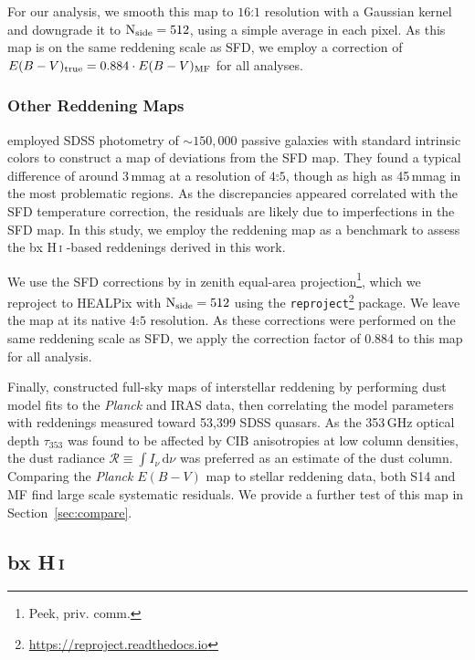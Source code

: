 \documentclass[iop,apj]{emulateapj}
\makeatletter
\def\testbx{bx}%
\DeclareRobustCommand{\ion}[2]{%
\relax\ifmmode
\ifx\testbx\f@series
{\mathbf{#1\,\mathsc{#2}}}\else
{\mathrm{#1\,\mathsc{#2}}}\fi
\else\textup{#1\,{\mdseries\textsc{#2}}}%
\fi}
\makeatother
\begin{document}
For our analysis, we smooth this map to $16\overset{'}{.}1$ resolution with a Gaussian kernel and downgrade it to $\rm N_{side}=512$, using a simple average in each pixel. As this map is on the same reddening scale as SFD, we employ a correction of $E(B-V)_{\rm true} = 0.884\cdot E(B-V)_{\rm MF}$ for all analyses.

\subsubsection{Other Reddening Maps}
\citet{Peek+Graves_2010} employed SDSS photometry of $\sim 150,000$ passive galaxies with standard intrinsic colors to construct a map of deviations from the SFD map. They found a typical difference of around 3\,mmag at a resolution of $4\overset{\circ}{.}5$, though as high as 45\,mmag in the most problematic regions. As the discrepancies appeared correlated with the SFD temperature correction, the residuals are likely due to imperfections in the SFD map. In this study, we employ the \citet{Peek+Graves_2010} reddening map as a benchmark to assess the \ion{H}{i}-based reddenings derived in this work. 

We use the SFD corrections by \citet{Peek+Graves_2010} in zenith equal-area projection\footnote{Peek, priv. comm.}, which we reproject to HEALPix with $\rm N_{side}=512$ using the \texttt{reproject}\footnote{\url{https://reproject.readthedocs.io}} package. We leave the map at its native $4\overset{\circ}{.}5$ resolution. As these corrections were performed on the same reddening scale as SFD, we apply the correction factor of 0.884 to this map for all analysis.

Finally, \citet{Planck_2013_XI} constructed full-sky maps of interstellar reddening by performing dust model fits to the {\it Planck} and IRAS data, then correlating the model parameters with reddenings measured toward 53,399 SDSS quasars. As the 353\,GHz optical depth $\tau_{353}$ was found to be affected by CIB anisotropies at low column densities, the dust radiance $\mathcal{R} \equiv \int I_{\nu}\,\mathrm{d}\nu$ was preferred as an estimate of the dust column. Comparing the {\it Planck} $E(B-V)$ map to stellar reddening data, both S14 and MF find large scale systematic residuals. We provide a further test of this map in Section~\ref{sec:compare}.

\subsection{\ion{H}{i}}
\end{document}
